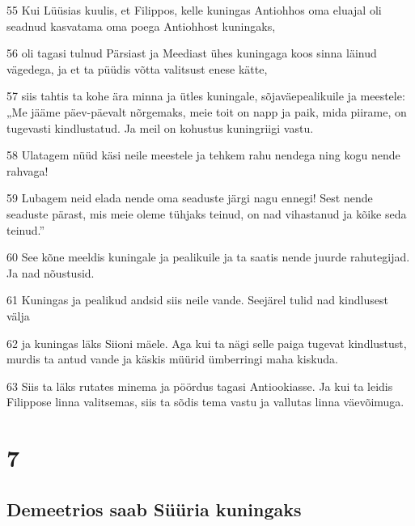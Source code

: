 \par 55 Kui Lüüsias kuulis, et Filippos, kelle kuningas Antiohhos oma eluajal oli seadnud kasvatama oma poega Antiohhost kuningaks,
\par 56 oli tagasi tulnud Pärsiast ja Meediast ühes kuningaga koos sinna läinud vägedega, ja et ta püüdis võtta valitsust enese kätte,
\par 57 siis tahtis ta kohe ära minna ja ütles kuningale, sõjaväepealikuile ja meestele: „Me jääme päev-päevalt nõrgemaks, meie toit on napp ja paik, mida piirame, on tugevasti kindlustatud. Ja meil on kohustus kuningriigi vastu.
\par 58 Ulatagem nüüd käsi neile meestele ja tehkem rahu nendega ning kogu nende rahvaga!
\par 59 Lubagem neid elada nende oma seaduste järgi nagu ennegi! Sest nende seaduste pärast, mis meie oleme tühjaks teinud, on nad vihastanud ja kõike seda teinud.”
\par 60 See kõne meeldis kuningale ja pealikuile ja ta saatis nende juurde rahutegijad. Ja nad nõustusid.
\par 61 Kuningas ja pealikud andsid siis neile vande. Seejärel tulid nad kindlusest välja
\par 62 ja kuningas läks Siioni mäele. Aga kui ta nägi selle paiga tugevat kindlustust, murdis ta antud vande ja käskis müürid ümberringi maha kiskuda.
\par 63 Siis ta läks rutates minema ja pöördus tagasi Antiookiasse. Ja kui ta leidis Filippose linna valitsemas, siis ta sõdis tema vastu ja vallutas linna väevõimuga.

\chapter{7}

\section*{Demeetrios saab Süüria kuningaks}

